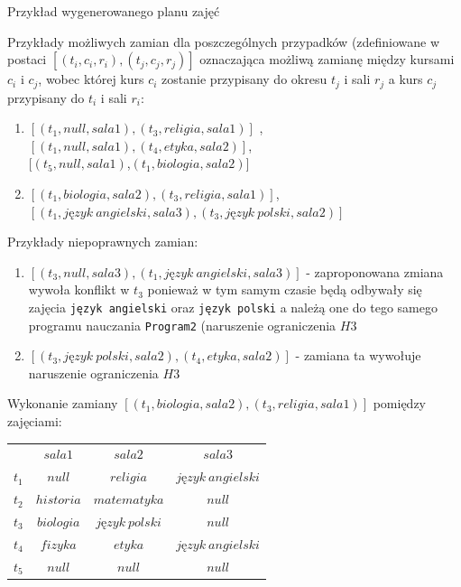 \begin{enumerate}
\begin{table}[H]
\caption {Przykład wygenerowanego planu zajęć}
\end{table} 
Przykłady możliwych zamian dla poszczególnych przypadków (zdefiniowane w postaci $[(t_{i}, c_{i}, r_{i}), (t_{j}, c_{j}, r_{j})]$ oznaczająca możliwą zamianę między kursami $c_{i}$ i $c_{j}$, wobec której kurs $c_{i}$ zostanie przypisany do okresu $t_{j}$ i sali $r_{j}$ a kurs $c_{j}$ przypisany do $t_{i}$ i sali $r_{i}$:
\begin{enumerate}
\item $[(t_{1}, null, sala1),(t_{3},religia, sala1)]$ , $[(t_{1}, null, sala1),(t_{4},etyka, sala2)]$,\\ $[(t_{5}, null, sala1)$,$(t_{1},biologia, sala2)]$ 
\item $[(t_{1}, biologia, sala2),(t_{3},religia, sala1)]$, $[(t_{1}, język\ angielski, sala3),(t_{3},język\ polski, sala2)]$
\end{enumerate}

Przykłady niepoprawnych zamian:
\begin{enumerate}
\item $[(t_{3}, null, sala3),(t_{1},język\ angielski, sala3)]$ - zaproponowana zmiana wywoła konflikt w $t_{3}$ ponieważ w tym samym czasie będą odbywały się zajęcia \verb#język angielski# oraz \verb#język polski# a należą one do tego samego programu nauczania \verb#Program2# (naruszenie ograniczenia $H3$
\item $[(t_{3}, język\ polski, sala2),(t_{4},etyka, sala2)]$ - zamiana ta wywołuje naruszenie ograniczenia $H3$
\end{enumerate}
Wykonanie zamiany $[(t_{1}, biologia, sala2),(t_{3},religia, sala1)]$ pomiędzy zajęciami:
\begin{table}[H]
\begin{center}
\begin{tabular}{ r|c|c|c| }
\multicolumn{1}{r}{}
 &  \multicolumn{1}{c}{$sala1$}
 & \multicolumn{1}{c}{$sala2$} 
 & \multicolumn{1}{c}{$sala3$} 
 \\
\cline{2-4}
$t_{1}$ & $null$ & $religia$ & $język\ angielski$  \\
\cline{2-4}
$t_{2}$ & $historia$ & $matematyka$  & $null$ \\
\cline{2-4}
$t_{3}$ & $biologia$ & $język\ polski$  & $null$ \\
\cline{2-4}
$t_{4}$ & $fizyka$ & $etyka$ & $język\ angielski$ \\
\cline{2-4}
$t_{5}$ & $null$ & $null$ & $null$ \\
\cline{2-4}
\end{tabular}
\end{center}


\end{table}
\end{enumerate}
